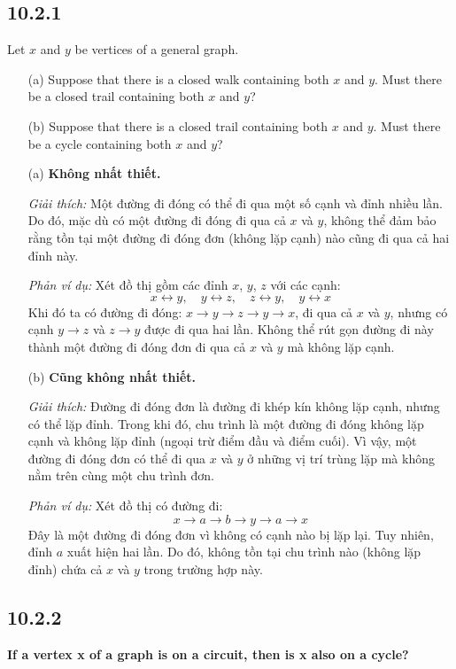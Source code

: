 \documentclass{article}
\begin{document}
	\subsection*{10.2.1}
	Let $x$ and $y$ be vertices of a general graph.
	\begin{itemize}
		\item[(a)] Suppose that there is a closed walk containing both $x$ and $y$. Must there be a closed trail containing both $x$ and $y$?
		\item[(b)] Suppose that there is a closed trail containing both $x$ and $y$. Must there be a cycle containing both $x$ and $y$?
	\end{itemize}
	\begin{itemize}[leftmargin=1.5em]
		\item[(a)] \textbf{Không nhất thiết.}
		
		\textit{Giải thích:} Một đường đi đóng có thể đi qua một số cạnh và đỉnh nhiều lần. Do đó, mặc dù có một đường đi đóng đi qua cả $x$ và $y$, không thể đảm bảo rằng tồn tại một đường đi đóng đơn (không lặp cạnh) nào cũng đi qua cả hai đỉnh này.
		
		\textit{Phản ví dụ:} Xét đồ thị gồm các đỉnh $x$, $y$, $z$ với các cạnh:
		\[
		x \leftrightarrow y,\quad y \leftrightarrow z,\quad z \leftrightarrow y,\quad y \leftrightarrow x
		\]
		Khi đó ta có đường đi đóng: $x \to y \to z \to y \to x$, đi qua cả $x$ và $y$, nhưng có cạnh $y \to z$ và $z \to y$ được đi qua hai lần. Không thể rút gọn đường đi này thành một đường đi đóng đơn đi qua cả $x$ và $y$ mà không lặp cạnh.
		
		\item[(b)] \textbf{Cũng không nhất thiết.}
		
		\textit{Giải thích:} Đường đi đóng đơn là đường đi khép kín không lặp cạnh, nhưng có thể lặp đỉnh. Trong khi đó, chu trình là một đường đi đóng không lặp cạnh và không lặp đỉnh (ngoại trừ điểm đầu và điểm cuối). Vì vậy, một đường đi đóng đơn có thể đi qua $x$ và $y$ ở những vị trí trùng lặp mà không nằm trên cùng một chu trình đơn.
		
		\textit{Phản ví dụ:} Xét đồ thị có đường đi:
		\[
		x \to a \to b \to y \to a \to x
		\]
		Đây là một đường đi đóng đơn vì không có cạnh nào bị lặp lại. Tuy nhiên, đỉnh $a$ xuất hiện hai lần. Do đó, không tồn tại chu trình nào (không lặp đỉnh) chứa cả $x$ và $y$ trong trường hợp này.
		
	\end{itemize}
	
	\subsection*{10.2.2}
	\textbf{If a vertex x of a graph is on a circuit, then is x also on a cycle?}
	
\end{document}
